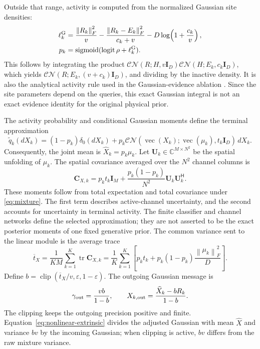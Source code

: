 \documentclass[10pt,a4paper]{article}
\newcommand{\CN}{\mathcal{CN}}
\newcommand{\I}{\mathbf{I}}
\newcommand{\vect}{\operatorname{vec}}
\newcommand{\tr}{\operatorname{tr}}
\newcommand{\logit}{\operatorname{logit}}
\newcommand{\sigmoid}{\operatorname{sigmoid}}
\newcommand{\clip}{\operatorname{clip}}
\newcommand{\norm}[1]{\left\lVert#1\right\rVert}
\begin{document}
Outside that range, activity is computed from the normalized Gaussian
site densities:
\begin{align}
 \ell_k^{\rm G}
 &=\frac{\norm{R_k}_F^2}{v}
   -\frac{\norm{R_k-E_k}_F^2}{c_k+v}
   -D\log\!\left(1+\frac{c_k}{v}\right),
 \label{eq:gaussian-evidence}\\
 p_k&=\sigmoid(\logit\rho+\ell_k^{\rm G}).\notag
\end{align}
This follows by integrating the product
$\CN(R;H,v\I_D)\CN(H;E_k,c_k\I_D)$, which yields
$\CN(R;E_k,(v+c_k)\I_D)$, and dividing by the inactive density.
It is also the analytical activity rule used in the Gaussian-evidence
ablation \cite[Sec.~III-B2]{cai2026}. Since the site parameters depend
on the queries, this exact Gaussian integral is not an exact evidence
identity for the original physical prior.

The activity probability and conditional Gaussian moments define the
terminal approximation
\begin{equation}
 \widetilde q_k(dX_k)=(1-p_k)\delta_0(dX_k)
             +p_k\CN(\vect(X_k);\vect(\mu_k),t_k\I_D)\,dX_k.
 \label{eq:mixture}
\end{equation}
Consequently, the joint mean is $\widehat X_k=p_k\mu_k$. Let
$\mathbf{U}_k\in\mathbb{C}^{M\times N^2}$ be the spatial unfolding of
$\mu_k$. The spatial covariance averaged over the $N^2$ channel columns
is
\begin{equation}
 \mathbf{C}_{X,k}=p_kt_k\I_M
              +\frac{p_k(1-p_k)}{N^2}\mathbf{U}_k\mathbf{U}_k^{\mathsf H}.
 \label{eq:joint-spatial-covariance}
\end{equation}
These moments follow from total expectation and total covariance under
\eqref{eq:mixture}. The first term describes active-channel uncertainty,
and the second accounts for uncertainty in terminal activity. The finite
classifier and channel networks define the selected approximation; they
are not asserted to be the exact posterior moments of one fixed
generative prior. The common variance sent to the linear module is the
average trace
\begin{equation}
 \overline t_X=\frac{1}{KM}\sum_{k=1}^{K}\tr\mathbf{C}_{X,k}
 =\frac1K\sum_{k=1}^{K}\left[
 p_kt_k+p_k(1-p_k)\frac{\norm{\mu_k}_F^2}{D}\right].
 \label{eq:joint-average-variance}
\end{equation}
Define $b=\clip(\overline t_X/v,\varepsilon,1-\varepsilon)$. The outgoing
Gaussian message is
\begin{equation}
 \gamma_{\rm out}=\frac{vb}{1-b},\qquad
 X_{k,\rm out}=\frac{\widehat X_k-bR_k}{1-b}.
 \label{eq:nonlinear-extrinsic}
\end{equation}
The clipping keeps the outgoing precision positive and finite.
Equation~\eqref{eq:nonlinear-extrinsic} divides the adjusted Gaussian
with mean $\widehat X$ and variance $bv$ by the incoming Gaussian;
when clipping is active, $bv$ differs from the raw mixture variance.
\end{document}
